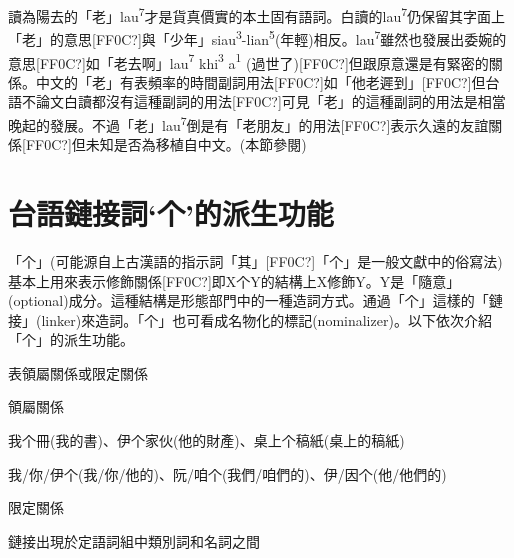 \textrm{讀為陽去的「老」lau}\textrm{\textsuperscript{7}}\textrm{才是貨真價實的本土固有語詞。白讀的lau}\textrm{\textsuperscript{7}}\textrm{仍保留其字面上「老」的意思[FF0C?]與「少年」siau}\textrm{\textsuperscript{3}}\textrm{{}-lian}\textrm{\textsuperscript{5}}\textrm{(年輕)相反。lau}\textrm{\textsuperscript{7}}\textrm{雖然也發展出委婉的意思[FF0C?]如「老去啊」lau}\textrm{\textsuperscript{7}} \textrm{khi}\textrm{\textsuperscript{3}} \textrm{a}\textrm{\textsuperscript{1} }\textrm{(過世了)}[FF0C?]\textrm{但跟原意還是有緊密的關係。中文的「老」有表頻率的時間副詞用法[FF0C?]如「他老遲到」[FF0C?]但台語不論文白讀都沒有這種副詞的用法[FF0C?]可見「老」的這種副詞的用法是相當晚起的發展。不過「老」lau}\textrm{\textsuperscript{7}}\textrm{倒是有「老朋友」的用法[FF0C?]表示久遠的友誼關係[FF0C?]但未知是否為移植自中文。(本節參閱\citealt{Lien2001})}

\section{\rmfamily 台語鏈接詞‘个’的派生功能}

\textrm{「个」(可能源自上古漢語的指示詞「其」[FF0C?]「个」是一般文獻中的俗寫法)基本上用來表示修飾關係[FF0C?]即X个Y的結構上X修飾Y}。\textrm{Y是「隨意」(optional)成分。這種結構是形態部門中的一種造詞方式。通過「个」這樣的「鏈接」(linker)來造詞。「个」也可看成名物化的標記(nominalizer)。以下依次介紹「个」的派生功能。}

\begin{listWWviiiNumxivleveli}
\item \begin{styleqwerty}\rmfamily
表領屬關係或限定關係
\end{styleqwerty}
\end{listWWviiiNumxivleveli}

\begin{listWWviiiNumxxleveli}
\item \begin{styleqwerty}\rmfamily
領屬關係
\end{styleqwerty}
\end{listWWviiiNumxxleveli}

\textrm{我个冊(我的書)}、\textrm{伊个家伙(他的財產)}、\textrm{桌上个稿紙(桌上的稿紙)}

\textrm{我/你/伊个(我/你/他的)}、\textrm{阮/咱个(我們/咱們的)}、\textrm{伊/因个(他/他們的)}

\begin{listWWviiiNumxxleveli}
\item \begin{styleqwerty}\rmfamily
限定關係
\end{styleqwerty}
\end{listWWviiiNumxxleveli}
\rmfamily
鏈接出現於定語詞組中類別詞和名詞之間

